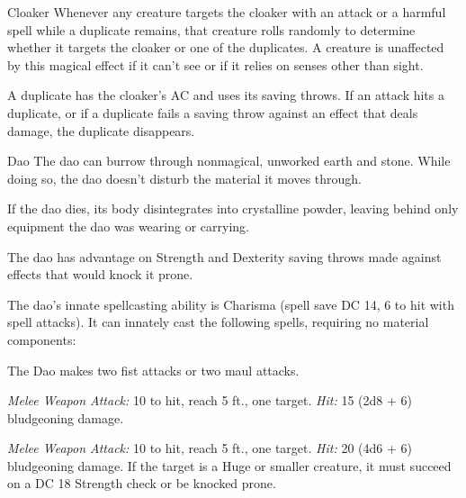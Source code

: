 \documentclass[10pt,a4paper,twoside,bg=print,twocolumn,openany,nodeprecatedcode]{dndbook}
\begin{document}
\begin{DndMonster}[float=t]{Cloaker}
Whenever any creature targets the cloaker with an attack or a harmful spell while a duplicate remains, that creature rolls randomly to determine whether it targets the cloaker or one of the duplicates. A creature is unaffected by this magical effect if it can't see or if it relies on senses other than sight.

A duplicate has the cloaker's AC and uses its saving throws. If an attack hits a duplicate, or if a duplicate fails a saving throw against an effect that deals damage, the duplicate disappears.

\end{DndMonster}



\begin{DndMonster}[float=t]{Dao}
\DndMonsterBasics[
armor-class = {18 (natural armor)},
hit-points = {\DndDice{15d10 + 105}},
speed = {30 ft., burrow 30 ft., fly 30 ft.}
]
\DndMonsterAbilityScores[
 str = 23,
 dex = 12,
 con = 24,
 int = 12,
 wis = 13,
 cha = 14
]
\DndMonsterDetails[
saving-throws = {Int +5, Wis +5, Cha +6},
condition-immunities = {petrified},
senses = {darkvision 120 ft., passive perception 11},
languages = {Terran},
challenge = 11,
]
The dao can burrow through nonmagical, unworked earth and stone. While doing so, the dao doesn't disturb the material it moves through.

If the dao dies, its body disintegrates into crystalline powder, leaving behind only equipment the dao was wearing or carrying.

The dao has advantage on Strength and Dexterity saving throws made against effects that would knock it prone.

The dao's innate spellcasting ability is Charisma (spell save DC 14, 6 to hit with spell attacks). It can innately cast the following spells, requiring no material components:
\begin{DndMonsterSpells}
\end{DndMonsterSpells}
The Dao makes two fist attacks or two maul attacks.

\textsl{Melee Weapon Attack:} 10 to hit, reach 5 ft., one target. \textsl{Hit:} 15 (2d8 + 6) bludgeoning damage.

\textsl{Melee Weapon Attack:} 10 to hit, reach 5 ft., one target. \textsl{Hit:} 20 (4d6 + 6) bludgeoning damage. If the target is a Huge or smaller creature, it must succeed on a DC 18 Strength check or be knocked prone.

\end{DndMonster}
\end{document}
